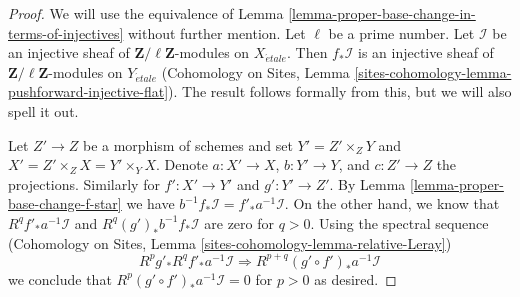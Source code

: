 \documentclass[10pt,a4paper]{amsart}
\theoremstyle{plain}
\theoremstyle{definition}
\theoremstyle{remark}
\numberwithin{equation}{subsection}
\def\etale{{\acute{e}tale}}
\begin{document}
\begin{proof}
We will use the equivalence of
Lemma \ref{lemma-proper-base-change-in-terms-of-injectives}
without further mention. Let $\ell$ be a prime number.
Let $\mathcal{I}$ be an injective sheaf of
$\mathbf{Z}/\ell\mathbf{Z}$-modules on $X_\etale$.
Then $f_*\mathcal{I}$ is an injective sheaf of
$\mathbf{Z}/\ell\mathbf{Z}$-modules on $Y_\etale$
(Cohomology on Sites, Lemma
\ref{sites-cohomology-lemma-pushforward-injective-flat}).
The result follows formally from this, but we will also
spell it out.

\medskip\noindent
Let $Z' \to Z$ be a morphism of schemes and set
$Y' = Z' \times_Z Y$ and $X' = Z' \times_Z X = Y' \times_ Y X$.
Denote $a : X' \to X$, $b : Y' \to Y$, and $c : Z' \to Z$ the
projections. Similarly for $f' : X' \to Y'$ and $g' : Y' \to Z'$.
By Lemma \ref{lemma-proper-base-change-f-star} we have
$b^{-1}f_*\mathcal{I} = f'_*a^{-1}\mathcal{I}$.
On the other hand, we know that $R^qf'_*a^{-1}\mathcal{I}$ and
$R^q(g')_*b^{-1}f_*\mathcal{I}$ are zero for $q > 0$.
Using the spectral sequence
(Cohomology on Sites, Lemma \ref{sites-cohomology-lemma-relative-Leray})
$$
R^pg'_* R^qf'_* a^{-1}\mathcal{I} \Rightarrow
R^{p + q}(g' \circ f')_* a^{-1}\mathcal{I}
$$
we conclude that $R^p(g' \circ f')_*a^{-1}\mathcal{I} = 0$ for
$p > 0$ as desired.
\end{proof}
\end{document}
